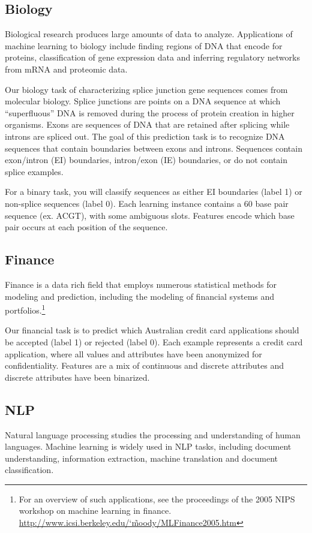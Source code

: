 \documentclass[11pt]{article}
\begin{document}
\subsection{Biology}
	Biological research produces large amounts of data to analyze. Applications of machine learning to biology include finding regions of DNA that encode for proteins, classification of gene expression data and inferring regulatory networks from mRNA and proteomic data.
	
	Our biology task of characterizing splice junction gene sequences comes from molecular biology.  Splice junctions are points on a DNA sequence at which ``superfluous'' DNA is removed during the process of protein creation in higher organisms. Exons are sequences of DNA that are retained after splicing while introns are spliced out. The goal of this prediction task is to recognize DNA sequences that contain boundaries between exons and introns. Sequences contain exon/intron (EI) boundaries, intron/exon (IE) boundaries, or do not contain splice examples.
	
	For a binary task, you will classify sequences as either EI boundaries (label 1) or non-splice sequences (label 0). Each learning instance contains a 60 base pair sequence (ex. ACGT), with some ambiguous slots. Features encode which base pair occurs at each position of the sequence.

\subsection{Finance}
Finance is a data rich field that employs numerous statistical methods for modeling and prediction, including the modeling of financial systems and portfolios.\footnote{For an overview of such applications, see the proceedings of the 2005 NIPS workshop on machine learning in finance. \href{http://www.icsi.berkeley.edu/~moody/MLFinance2005.htm}{http://www.icsi.berkeley.edu/\char`\~moody/MLFinance2005.htm}}

Our financial task is to predict which Australian credit card applications should be accepted (label 1) or rejected (label 0). Each example represents a credit card application, where all values and attributes have been anonymized for confidentiality. Features are a mix of continuous and discrete attributes and discrete attributes have been binarized.

\subsection{NLP}
Natural language processing studies the processing and understanding of human languages. Machine learning is widely used in NLP tasks, including document understanding, information extraction, machine translation and document classification.
\end{document}
